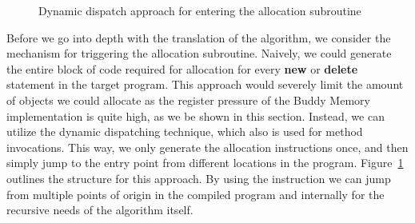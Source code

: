 \begin{figure}[ht]
    \centering
    \caption{Dynamic dispatch approach for entering the allocation subroutine}
    \label{fig:buddy-allocation-entry}
\end{figure}

Before we go into depth with the translation of the algorithm, we consider the mechanism for triggering the allocation subroutine. Naively, we could generate the entire block of code required for allocation for every \textbf{new} or \textbf{delete} statement in the target program. This approach would severely limit the amount of objects we could allocate as the register pressure of the Buddy Memory implementation is quite high, as we be shown in this section. Instead, we can utilize the  dynamic dispatching technique, which also is used for method invocations. This way, we only generate the allocation instructions once, and then simply jump to the entry point from different locations in the program. Figure~\ref{fig:buddy-allocation-entry} outlines the structure for this approach. By using the  instruction we can jump from multiple points of origin in the compiled program and internally for the recursive needs of the algorithm itself.

